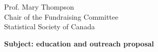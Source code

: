 \documentclass[11pt, a4paper]{letter} %
\begin{document}
\begin{letter}{
	Prof. Mary Thompson\\
	Chair of the Fundraising Committee\\
	Statistical Society of Canada
	
	\bigskip
	\textbf{Subject: education and outreach proposal}%
}



\end{letter}
\end{document}
